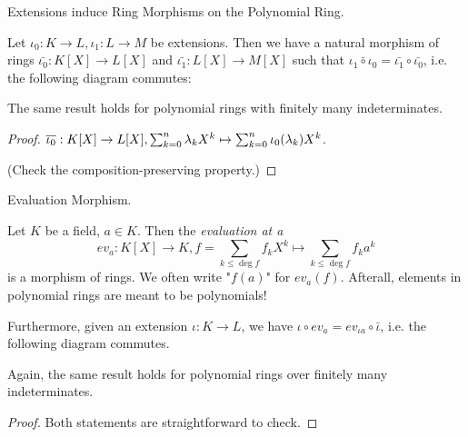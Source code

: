 \documentclass[../book.tex]{subfiles}
\begin{document}
\begin{lem} Extensions induce Ring Morphisms on the Polynomial Ring. 

    Let $\iota_0 : K \to L, \iota_1 : L \to M$ be extensions. 
    Then we have a natural morphism of rings $\bar{\iota_0} : K[X] \to L[X]$
    and $\bar{\iota_1} : L[X] \to M[X]$ such that 
    $\bar{\iota_1 \circ \iota_0} = \bar{\iota_1} \circ \bar{\iota_0}$,
    i.e. the following diagram commutes: 
    \begin{figure}[ht]
        \centering
        \label{fig:polyring_functor}
    \end{figure}

    The same result holds for polynomial rings 
    with finitely many indeterminates.
\end{lem}
\begin{proof}
    $\overline{\iota_0} : K[X] \to L[X], 
    \sum_{k=0}^n \lambda_kX^k \mapsto \sum_{k = 0}^n \iota_0(\lambda_k)X^k$. 
    
    (Check the composition-preserving property.)
\end{proof}
\begin{lem} Evaluation Morphism. 

    Let $K$ be a field, $a \in K$. 
    Then the \emph{evaluation at a} 
    \[ev_a : K[X] \to K, 
    f = \sum_{k \leq \deg f} f_k X^k \mapsto \sum_{k\leq\deg f} f_k a^k\]
    is a morphism of rings. 
    We often write "$f(a)$" for $ev_a (f)$. 
    Afterall, elements in polynomial rings are meant to be polynomials! 

    Furthermore, given an extension $\iota : K \to L$, 
    we have $\iota \circ ev_a = ev_{\iota a} \circ \bar{\iota}$,
    i.e. the following diagram commutes. 
    \begin{figure}[ht]
        \centering
    \label{fig:ev}
    \end{figure}

    Again, the same result holds for polynomial rings 
    over finitely many indeterminates. 
\end{lem}
\begin{proof} Both statements are straightforward to check. 
\end{proof}
\end{document}
